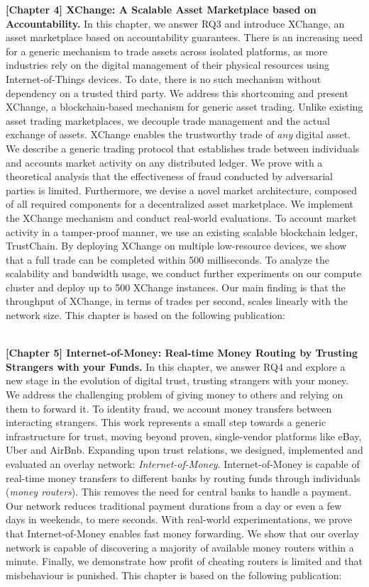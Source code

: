 \textbf{[Chapter 4] XChange: A Scalable Asset Marketplace based on Accountability.}
In this chapter, we answer RQ3 and introduce XChange, an asset marketplace based on accountability guarantees.
There is an increasing need for a generic mechanism to trade assets across isolated platforms, as more industries rely on the digital management of their physical resources using Internet-of-Things devices.
To date, there is no such mechanism without dependency on a trusted third party.
We address this shortcoming and present XChange, a blockchain-based mechanism for generic asset trading.
Unlike existing asset trading marketplaces, we decouple trade management and the actual exchange of assets.
XChange enables the trustworthy trade of \emph{any} digital asset.
We describe a generic trading protocol that establishes trade between individuals and accounts market activity on any distributed ledger.
We prove with a theoretical analysis that the effectiveness of fraud conducted by adversarial parties is limited.
Furthermore, we devise a novel market architecture, composed of all required components for a decentralized asset marketplace.
We implement the XChange mechanism and conduct real-world evaluations.
To account market activity in a tamper-proof manner, we use an existing scalable blockchain ledger, TrustChain.
By deploying XChange on multiple low-resource devices, we show that a full trade can be completed within 500 milliseconds.
To analyze the scalability and bandwidth usage, we conduct further experiments on our compute cluster and deploy up to 500 XChange instances.
Our main finding is that the throughput of XChange, in terms of trades per second, scales linearly with the network size.
This chapter is based on the following publication:

\\

\textbf{[Chapter 5] Internet-of-Money: Real-time Money Routing by Trusting Strangers with your Funds.}
In this chapter, we answer RQ4 and explore a new stage in the evolution of digital trust, trusting strangers with your money.
We address the challenging problem of giving money to others and relying on them to forward it.
To identity fraud, we account money transfers between interacting strangers.
This work represents a small step towards a generic infrastructure for trust, moving beyond proven, single-vendor platforms like eBay, Uber and AirBnb.
Expanding upon trust relations, we designed, implemented and evaluated an overlay network: \emph{Internet-of-Money}.
Internet-of-Money is capable of real-time money transfers to different banks by routing funds through individuals (\emph{money routers}).
This removes the need for central banks to handle a payment.
Our network reduces traditional payment durations from a day or even a few days in weekends, to mere seconds.
With real-world experimentations, we prove that Internet-of-Money enables fast money forwarding.
We show that our overlay network is capable of discovering a majority of available money routers within a minute.
Finally, we demonstrate how profit of cheating routers is limited and that misbehaviour is punished.
This chapter is based on the following publication:

